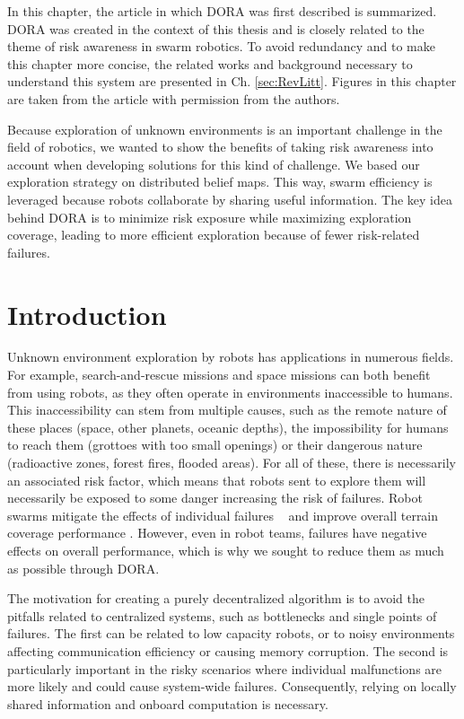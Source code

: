 \label{sec:Theme2}

In this chapter, the article in which \ac{DORA} was first described \cite{vielfaure2021dora} is summarized. \ac{DORA} was created in the context of this thesis and is closely related to the theme of risk awareness in swarm robotics. To avoid redundancy and to make this chapter more concise, the related works and background necessary to understand this system are presented in Ch. \ref{sec:RevLitt}. Figures in this chapter are taken from the article with permission from the authors.

Because exploration of unknown environments is an important challenge in the
field of robotics, we wanted to show the benefits of taking risk awareness into account when developing solutions for this kind of challenge. We based our exploration strategy on distributed belief maps. This way, swarm efficiency is leveraged because robots collaborate by sharing useful information. The key idea behind \ac{DORA} is to minimize risk exposure while maximizing exploration coverage, leading to more efficient exploration because of fewer risk-related failures. 


\section{Introduction}
Unknown environment exploration by robots has applications in numerous fields. For example, search-and-rescue missions \cite{matos2016multiple} and space missions \cite{fong2005interaction} can both benefit from using robots, as they often operate in environments inaccessible to humans. This inaccessibility can stem from multiple causes, such as the remote nature of these places (space, other planets, oceanic depths), the impossibility for humans to reach them (grottoes with too small openings) or their dangerous nature (radioactive zones, forest fires, flooded areas). For all of these, there is necessarily an associated risk factor, which means that robots sent to explore them will necessarily be exposed to some danger increasing the risk of failures. Robot swarms mitigate the effects of individual failures ~\cite{ramachandran2019resilience,wehbe2021probabilistic,winfield2006safety} and improve overall terrain coverage performance \cite{burgard2005coordinated}. However, even in robot teams, failures have negative effects on overall performance, which is why we sought to reduce them as much as possible through \ac{DORA}.

The motivation for creating a purely decentralized algorithm is to avoid the pitfalls related to centralized systems, such as bottlenecks and single points of failures. The first can be related to low capacity robots, or to noisy environments affecting communication efficiency or causing memory corruption. The second is particularly important in the risky scenarios where individual malfunctions are more likely and could cause system-wide failures. Consequently, relying on locally shared information and onboard computation is necessary.

